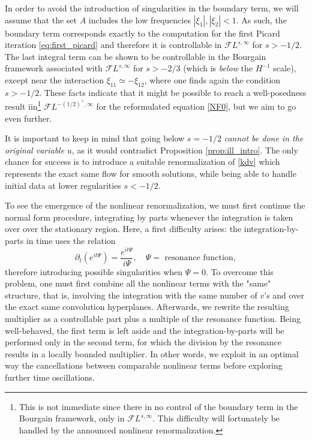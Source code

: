 \documentclass[%
11pt,  reqno]{amsart}
\newcommand{\5}{\textup{V}}
\theoremstyle{remark}
\numberwithin{equation}{section}
\numberwithin{theorem}{section}
\begin{document}
	In order to avoid the introduction of singularities in the boundary term, we will assume that the set $A$ includes the low frequencies $|\xi_1|, |\xi_2|<1$. As such, the boundary term corresponds exactly to the computation for the first Picard iteration \eqref{eq:first_picard} and therefore it is controllable in $ \mathcal{F}L^{s,\infty}$ for $s>-1/2$. The last integral term can be shown to be controllable in the Bourgain framework associated with $\mathcal{F}L^{s,\infty}$ for $s>-2/3$ (which is \emph{below} the $H^{-1}$ scale), except near the interaction $\xi_{11}\simeq - \xi_{12}$, where one finds again the condition $s>-1/2$. These facts indicate that it might be possible to reach a well-posedness result iin\footnote{This is not immediate since there in no control of the boundary term in the Bourgain framework, only in $\mathcal{F}L^{s,\infty}$. This difficulty will fortunately be handled by the announced nonlinear renormalization.} $\mathcal{F}L^{-(1/2)^+,\infty}$ for the reformulated equation \eqref{NF0}, but we aim to go even further.
	
	\medskip
	
	It is important to keep in mind that going below $s=-1/2$ \emph{cannot be done in the original variable} $u$, as it would contradict Proposition \ref{prop:ill_intro}. The only chance for success is to introduce a suitable renormalization of \eqref{kdv} which represents the exact same flow for smooth solutions, while being able to handle initial data at lower regularities $s<-1/2$.
	
	\medskip
	
	
	To see the emergence of the nonlinear renormalization, we must first continue the normal form procedure, integrating by parts whenever the integration is taken over over the stationary region. Here, a first difficulty arises: the integration-by-parts in time uses the relation
	$$
	\partial_t\left(e^{it\Psi}\right) = \frac{e^{it\Psi}}{i\Psi}, \quad \Psi=\mbox{ resonance function},
	$$
	therefore introducing possible singularities when $\Psi=0$. To overcome this problem, one must first combine all the nonlinear terms with the "same" structure, that is, involving the integration with the same number of $v$'s and over the exact same convolution hyperplanes. Afterwards, we rewrite the resulting multiplier as a controllable part plus a multiple of the resonance function. Being well-behaved, the first term is left aside and the integration-by-parts will be performed only in the second term, for which the division by the resonance results in a locally bounded multiplier. In other words, we exploit in an optimal way the cancellations between comparable nonlinear terms before exploring further time oscillations.
	
\end{document}
